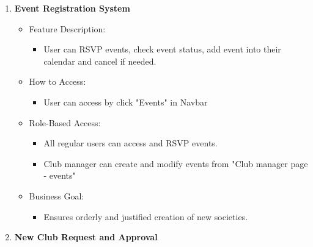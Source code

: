 \begin{enumerate}
\begin{itemize}
        \begin{itemize}
        \item
          All logged-in users can receive relevant notifications.
        \end{itemize}
      \item
        Business Goal:
    
        \begin{itemize}
        \item
          Enhances timely and relevant communication.
        \end{itemize}
      \end{itemize}
    \item
      \textbf{Event Registration System}
    
      \begin{itemize}
      \item
        Feature Description:
    
        \begin{itemize}
        \item
          User can RSVP events, check event status, add event into their
          calendar and cancel if needed.
        \end{itemize}
      \item
        How to Access:
    
        \begin{itemize}
        \item
          User can access by click "Events" in Navbar
        \end{itemize}
      \item
        Role-Based Access:
    
        \begin{itemize}
        \item
          All regular users can access and RSVP events.
        \item
          Club manager can create and modify events from "Club manager page
          - events"
        \end{itemize}
      \item
        Business Goal:
    
        \begin{itemize}
        \item
          Ensures orderly and justified creation of new societies.
        \end{itemize}
      \end{itemize}
    \item
      \textbf{New Club Request and Approval}
    

\end{enumerate}
